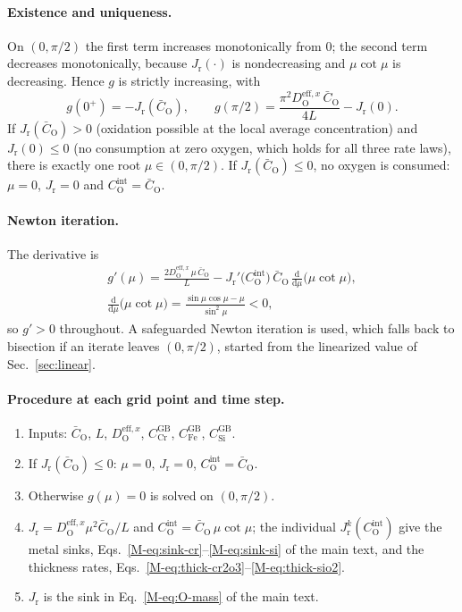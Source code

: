 \documentclass[12pt]{article}
\newcommand{\GB}{\mathrm{GB}}
\newcommand{\eff}{\mathrm{eff}}
\newcommand{\intf}{\mathrm{int}}
\newcommand{\Ox}{\mathrm{O}}
\newcommand{\Dx}{D_{\Ox}^{\eff,x}}
\newcommand{\Cb}{\bar{C}_{\Ox}}
\newcommand{\Ci}{C_{\Ox}^{\intf}}
\newcommand{\Jr}{J_{\mathrm{r}}}
\newcommand{\dd}{\mathrm{d}}
\begin{document}
\paragraph{Existence and uniqueness.} On \((0,\pi/2)\) the first term
increases monotonically from \(0\); the second term decreases monotonically,
because \(\Jr(\cdot)\) is nondecreasing and \(\mu\cot\mu\) is decreasing.
Hence \(g\) is strictly increasing, with
\begin{equation}
g(0^+)=-\Jr(\Cb),
\qquad
g(\pi/2)=\frac{\pi^2\Dx\,\Cb}{4L}-\Jr(0).
\end{equation}
If \(\Jr(\Cb)>0\) (oxidation possible at the local average concentration) and
\(\Jr(0)\le0\) (no consumption at zero oxygen, which holds for all three rate
laws), there is exactly one root \(\mu\in(0,\pi/2)\). If \(\Jr(\Cb)\le0\), no
oxygen is consumed: \(\mu=0\), \(\Jr=0\) and \(\Ci=\Cb\).

\paragraph{Newton iteration.} The derivative is
\begin{equation}
\begin{gathered}
g'(\mu)=\frac{2\Dx\,\mu\,\Cb}{L}
        -\Jr'\bigl(\Ci\bigr)\,\Cb\,\frac{\dd}{\dd\mu}\bigl(\mu\cot\mu\bigr),\\
\frac{\dd}{\dd\mu}\bigl(\mu\cot\mu\bigr)=\frac{\sin\mu\cos\mu-\mu}{\sin^2\mu}<0,
\end{gathered}
\end{equation}
so \(g'>0\) throughout. A safeguarded Newton iteration is used, which falls
back to bisection if an iterate leaves \((0,\pi/2)\), started from the
linearized value of Sec.~\ref{sec:linear}.

\paragraph{Procedure at each grid point and time step.}
\begin{enumerate}
  \item Inputs: \(\Cb\), \(L\), \(\Dx\), \(C_{\mathrm{Cr}}^{\GB}\),
        \(C_{\mathrm{Fe}}^{\GB}\), \(C_{\mathrm{Si}}^{\GB}\).
  \item If \(\Jr(\Cb)\le0\): \(\mu=0\), \(\Jr=0\), \(\Ci=\Cb\).
  \item Otherwise \(g(\mu)=0\) is solved on \((0,\pi/2)\).
  \item \(\Jr=\Dx\mu^2\Cb/L\) and \(\Ci=\Cb\,\mu\cot\mu\); the individual
        \(\Jr^{k}(\Ci)\) give the metal sinks,
        Eqs.~\eqref{M-eq:sink-cr}--\eqref{M-eq:sink-si} of the main text, and
        the thickness rates,
        Eqs.~\eqref{M-eq:thick-cr2o3}--\eqref{M-eq:thick-sio2}.
  \item \(\Jr\) is the sink in Eq.~\eqref{M-eq:O-mass} of the main text.
\end{enumerate}
\end{document}
